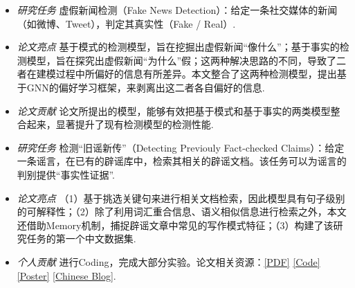 \documentclass{resume}
\begin{document}
{\small {}
}
\small
\begin{itemize}
  \item \textit{研究任务} \quad 虚假新闻检测（Fake News Detection）：给定一条社交媒体的新闻（如微博、Tweet），判定其真实性（Fake / Real）.
  \item \textit{论文亮点} \quad 基于模式的检测模型，旨在挖掘出虚假新闻“像什么”；基于事实的检测模型，旨在探究出虚假新闻“为什么”假；这两种解决思路的不同，导致了二者在建模过程中所偏好的信息有所差异。本文整合了这两种检测模型，提出基于GNN的偏好学习框架，来剥离出这二者各自偏好的信息.
  \item \textit{论文贡献} \quad 论文所提出的模型，能够有效把基于模式和基于事实的两类模型整合起来，显著提升了现有检测模型的检测性能.
\end{itemize}

{\small {}}
\small
\begin{itemize}
  \item \textit{研究任务} \quad 检测“旧谣新传”（Detecting Previouly Fact-checked Claims）：给定一条谣言，在已有的辟谣库中，检索其相关的辟谣文档。该任务可以为谣言的判别提供“事实性证据”.
  \item \textit{论文亮点} \quad （1）基于挑选关键句来进行相关文档检索，因此模型具有句子级别的可解释性；（2）除了利用词汇重合信息、语义相似信息进行检索之外，本文还借助Memory机制，捕捉辟谣文章中常见的写作模式特征；（3）构建了该研究任务的第一个中文数据集.
  \item \textit{个人贡献} \quad 进行Coding，完成大部分实验。论文相关资源：\href{https://aclanthology.org/2021.acl-long.425.pdf}{[PDF]} \href{https://github.com/ICTMCG/MTM}{[Code]} \href{https://www.zhangxueyao.com/data/acl2021-MTM-poster.pdf}{[Poster]} \href{https://zhuanlan.zhihu.com/p/393615707}{[Chinese Blog]}.
\end{itemize}
\end{document}
